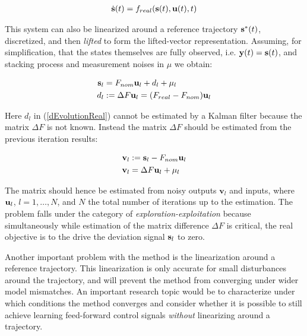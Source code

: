 \begin{align}
\dot{\mathbf{s}}(t) &= f_{real}(\mathbf{s}(t), \mathbf{u}(t), t) \\
\end{align}

This system can also be linearized around a reference trajectory $\mathbf{s}^{*}(t)$, discretized, and then \emph{lifted} to form the lifted-vector representation. Assuming, for simplification, that the states themselves are fully observed, i.e. $\mathbf{y}(t) = \mathbf{s}(t)$, and stacking process and measurement noises in $\mu$ we obtain:

\begin{align}
\mathbf{s}_{l} &= F_{nom}\mathbf{u}_{l} + d_{l} + \mu_{l} \label{liftedXiterNom} \\
d_{l} &:= \Delta F \mathbf{u}_{l} = (F_{real}-F_{nom})\mathbf{u}_{l} \label{dEvolutionReal}	
\end{align}

Here $d_{l}$ in (\ref{dEvolutionReal}) cannot be estimated by a Kalman filter because the matrix $\Delta F$ is not known. Instead the matrix $\Delta F$ should be estimated from the previous iteration results:

\begin{align}
\mathbf{v}_{l} &:= \mathbf{s}_{l} - F_{nom}\mathbf{u}_{l} \\
\mathbf{v}_{l} &= \Delta F \mathbf{u}_{l} + \mu_{l}
\end{align}

The matrix should hence be estimated from noisy outputs $\mathbf{v}_{l}$ and inputs, where $\mathbf{u}_{l}$, $l = 1, \ldots, N$, and $N$ the total number of iterations up to the estimation. The problem falls under the category of \emph{exploration-exploitation} because simultaneously while estimation of the matrix difference $\Delta F$ is critical, the real objective is to the drive the deviation signal $\mathbf{s}_{l}$ to zero.


Another important problem with the method is the linearization around a reference trajectory. This linearization is only accurate for small disturbances around the trajectory, and will prevent the method from converging under wider model mismatches. An important research topic would be to characterize under which conditions the method converges and consider whether it is possible to still achieve learning feed-forward control signals \emph{without} linearizing around a trajectory.

